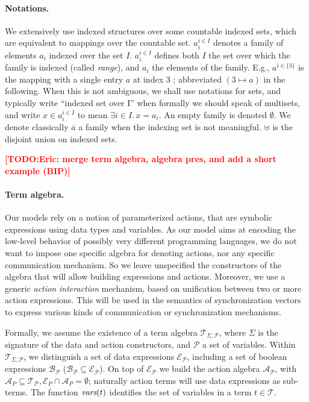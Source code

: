 \documentclass{lncs/llncs}
\newcommand{\TODO}[1]{\textcolor{red}{\textbf{[TODO:#1]}}}
\def\AlgT{\mathcal{T}}
\renewcommand{\P}{\mathcal P}
\begin{document}
\paragraph*{Notations.}
We extensively use indexed structures
over some countable indexed sets, which are equivalent to mappings over
the countable set. %
$a_i^{i\in I}$
denotes a family of elements $a_i$ indexed over the
set $I$. %
$a_i^{i\in I}$ defines both $I$ the set over which the family is
indexed (called \emph{range}), and $a_i$ the elements of the family.
E.g., $a^{i\in\{3\}}$ is the mapping with a single entry $a$ at index
$3$ ; abbreviated $(3\mapsto a)$ in the following.
When this is not
ambiguous, we shall use notations for sets, and typically write
``indexed set over I'' when formally we should speak of multisets, and
write $x\in a_i^{i\in I}$ to mean $\exists i\in I.\, x=a_i$.  An empty
family is denoted $\emptyset$. We
denote classically $\overline{a}$ a family when the indexing set is
not meaningful.  $\uplus$ is the disjoint union on
indexed sets.

\TODO{Eric: merge term algebra, algebra pres, and add a short example (BIP)}

\paragraph*{Term algebra.}
Our models rely on a notion of parameterized actions, that are
symbolic expressions using data types and variables. As our model aims
at encoding the low-level behavior of possibly very different
programming languages, we do not want to impose one specific algebra
for denoting actions, nor any specific communication mechanism. So we
leave unspecified the constructors of the algebra that will allow building
expressions and actions. Moreover, we use a generic {\em action interaction}
mechanism, based on unification between two or more action
expressions. This will be used in the semantics of synchronization
vectors to express various kinds of communication or synchronization mechanisms.

\def\Talg{\mathcal{T}_{\Sigma,\P}}
Formally, we assume the existence of a term algebra $\Talg$,
where $\Sigma$ is the signature of the data and action constructors,
and $\P$ a set of variables. Within $\Talg$, we distinguish a set of
data expressions $\mathcal{E}_\P$, including a set of boolean
expressions $\mathcal{B}_{\P}$ ($\mathcal{B}_{\P}\subseteq\mathcal{E}_\P$).
On top of $\mathcal{E}_\P$ we build the action algebra
$\mathcal{A}_\P$, with $\mathcal{A}_P\subseteq\mathcal{T}_\P,
\mathcal{E}_P\cap\mathcal{A}_P=\emptyset$;
naturally action terms will use data expressions as sub-terms.
The function $\vars(t)$ identifies the set of variables in a term
$t\in\AlgT$.
\end{document}
